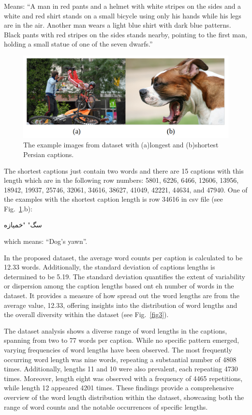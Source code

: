 \documentclass[runningheads]{llncs}
\begin{document}
Means: ``A man in red pants and a helmet with white stripes on the sides and a white and red shirt stands on a small bicycle using only his hands while his legs are in the air. Another man wears a light blue shirt with dark blue patterns. Black pants with red stripes on the sides stands nearby, pointing to the first man, holding a small statue of one of the seven dwarfs.''

\begin{figure}
\includegraphics[width=\textwidth]{long_short.jpg}
\caption{The example images from dataset with (a)longest and (b)shortest Persian captions.} \label{fig2}
\end{figure}

The shortest captions just contain two words and there are 15 captions with this length which are in the following row numbers: 5801, 6226, 6466, 12606, 13956, 18942, 19937, 25746, 32061, 34616, 38627, 41049, 42221, 44634, and 47940. One of the examples with the shortest caption length is row 34616 in csv file (see Fig.~\ref{fig2}.b):\begin{farsi}
\arabicfont\small
سگ" "خمیازه\end{farsi}
which means: ``Dog's yawn''.

In the proposed dataset, the average word counts per caption is calculated to be 12.33 words. Additionally, the standard deviation of captions lengths is determined to be 5.19. The standard deviation quantifies the extent of variability or dispersion among the caption lengths based ont eh number of words in the dataset. It provides a measure of how spread out the word lengths are from the average value, 12.33, offering insights into the distribution of word lengths and the overall diversity within the dataset (see Fig.~\ref{fig3}).

The dataset analysis shows a diverse range of word lengths in the captions, spanning from two to 77 words per caption. While no specific pattern emerged, varying frequencies of word lengths have been observed. The most frequently occurring word length was nine words, repeating a substantial number of 4808 times. Additionally, lengths 11 and 10 were also prevalent, each repeating 4730 times. Moreover, length eight was observed with a frequency of 4465 repetitions, while length 12 appeared 4201 times. These findings provide a comprehensive overview of the word length distribution within the dataset, showcasing both the range of word counts and the notable occurrences of specific lengths.
\end{document}
